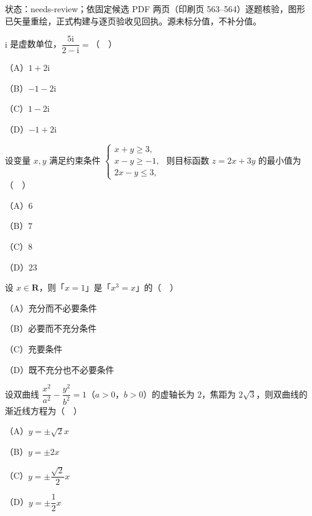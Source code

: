 

状态：needs-review；依固定候选 PDF 两页（印刷页 563–564）逐题核验，图形已矢量重绘，正式构建与逐页验收见回执。源未标分值，不补分值。


\begin{question}
$\mathrm i$ 是虚数单位，$\dfrac{5\mathrm i}{2-\mathrm i}=$（　）

（A）$1+2\mathrm i$

（B）$-1-2\mathrm i$

（C）$1-2\mathrm i$

（D）$-1+2\mathrm i$

\end{question}
\begin{question}
设变量 $x,y$ 满足约束条件 $\begin{cases}x+y\geqslant3,\\ x-y\geqslant-1,\\ 2x-y\leqslant3,\end{cases}$ 则目标函数 $z=2x+3y$ 的最小值为（　）

（A）$6$

（B）$7$

（C）$8$

（D）$23$

\end{question}
\begin{question}
设 $x\in\mathbf R$，则「$x=1$」是「$x^3=x$」的（　）

（A）充分而不必要条件

（B）必要而不充分条件

（C）充要条件

（D）既不充分也不必要条件

\end{question}
\begin{question}
设双曲线 $\dfrac{x^2}{a^2}-\dfrac{y^2}{b^2}=1$（$a>0$，$b>0$）的虚轴长为 $2$，焦距为 $2\sqrt3$，则双曲线的渐近线方程为（　）

（A）$y=\pm\sqrt2x$

（B）$y=\pm2x$

（C）$y=\pm\dfrac{\sqrt2}{2}x$

（D）$y=\pm\dfrac12x$

\end{question}
